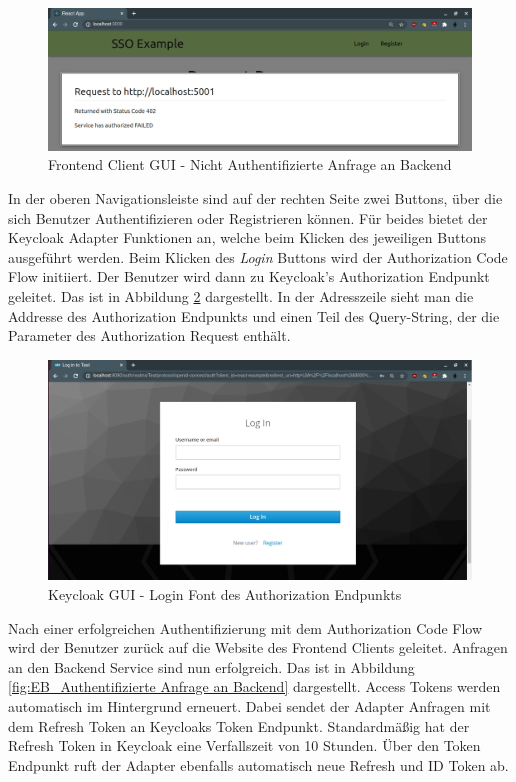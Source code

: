\begin{figure}[!ht]
	\centering
	\includegraphics[width=1\textwidth]{Images/Ebert/FrontendLoggedOutBackendRequest.PNG}
	\caption{Frontend Client GUI - Nicht Authentifizierte Anfrage an Backend}
	\label{fig:EB_Nicht Authentifizierte Anfrage an Backend}
\end{figure}

In der oberen Navigationsleiste sind auf der rechten Seite zwei Buttons, über die sich Benutzer Authentifizieren oder Registrieren können. Für beides bietet der Keycloak Adapter Funktionen an, welche beim Klicken des jeweiligen Buttons ausgeführt werden. Beim Klicken des \textit{Login} Buttons wird der Authorization Code Flow initiiert. Der Benutzer wird dann zu Keycloak's Authorization Endpunkt geleitet. Das ist in Abbildung \ref{fig:EB_Login Font des Authorization Endpunkts} dargestellt. In der Adresszeile sieht man die Addresse des Authorization Endpunkts und einen Teil des Query-String, der die Parameter des Authorization Request enthält.

\begin{figure}[!ht]
	\centering
	\includegraphics[width=1\textwidth]{Images/Ebert/FrontendLoginForm.PNG}
	\caption{Keycloak GUI - Login Font des Authorization Endpunkts}
	\label{fig:EB_Login Font des Authorization Endpunkts}
\end{figure}

Nach einer erfolgreichen Authentifizierung mit dem Authorization Code Flow wird der Benutzer zurück auf die Website des Frontend Clients geleitet. Anfragen an den Backend Service sind nun erfolgreich. Das ist in Abbildung \ref{fig:EB_Authentifizierte Anfrage an Backend} dargestellt. Access Tokens werden automatisch im Hintergrund erneuert. Dabei sendet der Adapter Anfragen mit dem Refresh Token an Keycloaks Token Endpunkt. Standardmäßig hat der Refresh Token in Keycloak eine Verfallszeit von 10 Stunden. Über den Token Endpunkt ruft der Adapter ebenfalls automatisch neue Refresh und ID Token ab.

